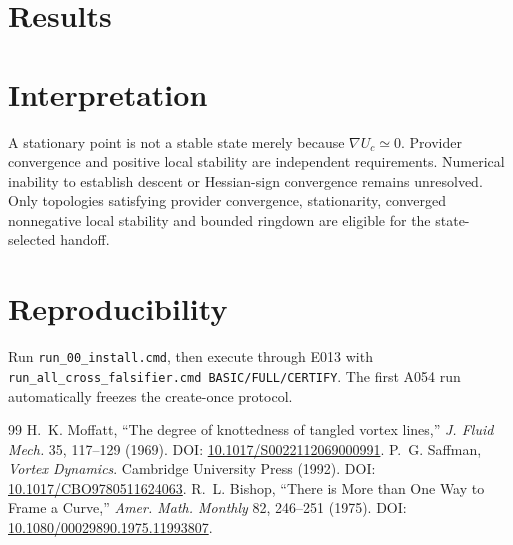 \documentclass[11pt]{article}
\begin{document}
\section{Results}
\section{Interpretation}
A stationary point is not a stable state merely because $\nabla U_c\simeq0$. Provider convergence and positive local stability are independent requirements. Numerical inability to establish descent or Hessian-sign convergence remains unresolved. Only topologies satisfying provider convergence, stationarity, converged nonnegative local stability and bounded ringdown are eligible for the state-selected handoff.
\section{Reproducibility}
Run \texttt{run\_00\_install.cmd}, then execute through E013 with \texttt{run\_all\_cross\_falsifier.cmd BASIC/FULL/CERTIFY}. The first A054 run automatically freezes the create-once protocol.
\begin{thebibliography}{99}
 H.~K. Moffatt, ``The degree of knottedness of tangled vortex lines,'' \emph{J. Fluid Mech.} 35, 117--129 (1969). DOI: \href{https://doi.org/10.1017/S0022112069000991}{10.1017/S0022112069000991}.
 P.~G. Saffman, \emph{Vortex Dynamics}. Cambridge University Press (1992). DOI: \href{https://doi.org/10.1017/CBO9780511624063}{10.1017/CBO9780511624063}.
 R.~L. Bishop, ``There is More than One Way to Frame a Curve,'' \emph{Amer. Math. Monthly} 82, 246--251 (1975). DOI: \href{https://doi.org/10.1080/00029890.1975.11993807}{10.1080/00029890.1975.11993807}.
\end{thebibliography}
\end{document}
